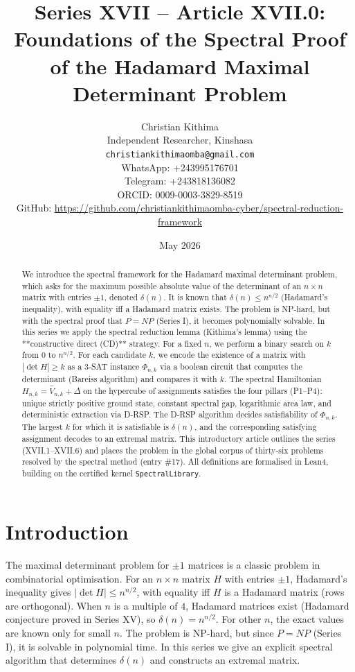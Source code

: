 \documentclass[11pt,a4paper]{article}
\title{Series XVII – Article XVII.0: Foundations of the Spectral Proof of the Hadamard Maximal Determinant Problem}
\author{Christian Kithima \\
Independent Researcher, Kinshasa \\
\texttt{christiankithimaomba@gmail.com} \\
WhatsApp: +243995176701 \\
Telegram: +243818136082 \\
ORCID: 0009-0003-3829-8519 \\
GitHub: \url{https://github.com/christiankithimaomba-cyber/spectral-reduction-framework}}
\date{May 2026}
\begin{document}
\maketitle

\begin{abstract}
We introduce the spectral framework for the Hadamard maximal determinant problem, which asks for the maximum possible absolute value of the determinant of an $n\times n$ matrix with entries $\pm1$, denoted $\delta(n)$. It is known that $\delta(n) \le n^{n/2}$ (Hadamard's inequality), with equality iff a Hadamard matrix exists. The problem is NP‑hard, but with the spectral proof that $P = NP$ (Series I), it becomes polynomially solvable. In this series we apply the spectral reduction lemma (Kithima's lemma) using the **constructive direct (CD)** strategy. For a fixed $n$, we perform a binary search on $k$ from $0$ to $n^{n/2}$. For each candidate $k$, we encode the existence of a matrix with $|\det H| \ge k$ as a 3‑SAT instance $\Phi_{n,k}$ via a boolean circuit that computes the determinant (Bareiss algorithm) and compares it with $k$. The spectral Hamiltonian $H_{n,k} = \hat{V}_{n,k} + \Delta$ on the hypercube of assignments satisfies the four pillars (P1–P4): unique strictly positive ground state, constant spectral gap, logarithmic area law, and deterministic extraction via D‑RSP. The D‑RSP algorithm decides satisfiability of $\Phi_{n,k}$. The largest $k$ for which it is satisfiable is $\delta(n)$, and the corresponding satisfying assignment decodes to an extremal matrix. This introductory article outlines the series (XVII.1–XVII.6) and places the problem in the global corpus of thirty‑six problems resolved by the spectral method (entry \#17). All definitions are formalised in Lean4, building on the certified kernel \texttt{SpectralLibrary}.
\end{abstract}

\tableofcontents

\section{Introduction}

The maximal determinant problem for $\pm1$ matrices is a classic problem in combinatorial optimisation. For an $n\times n$ matrix $H$ with entries $\pm1$, Hadamard's inequality gives $|\det H| \le n^{n/2}$, with equality iff $H$ is a Hadamard matrix (rows are orthogonal). When $n$ is a multiple of $4$, Hadamard matrices exist (Hadamard conjecture proved in Series XV), so $\delta(n)=n^{n/2}$. For other $n$, the exact values are known only for small $n$. The problem is NP‑hard, but since $P = NP$ (Series I), it is solvable in polynomial time. In this series we give an explicit spectral algorithm that determines $\delta(n)$ and constructs an extremal matrix.
\end{document}

